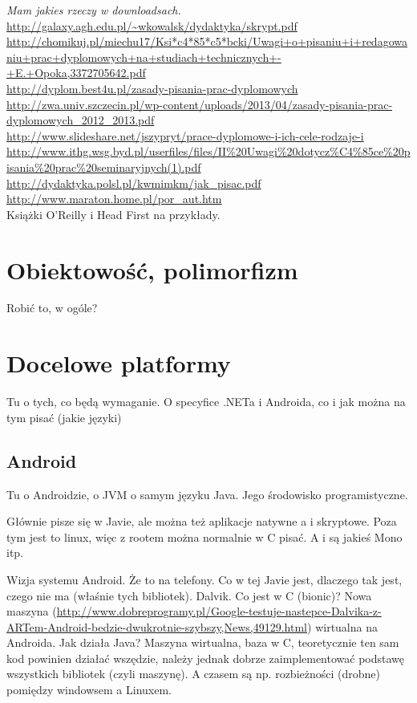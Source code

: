 \emph{Mam jakies rzeczy w downloadsach.} \\
\url{http://galaxy.agh.edu.pl/~wkowalsk/dydaktyka/skrypt.pdf}\\
\url{http://chomikuj.pl/miechu17/Ksi*c4*85*c5*bcki/Uwagi+o+pisaniu+i+redagowaniu+prac+dyplomowych+na+studiach+technicznych+-+E.+Opoka,3372705642.pdf}\\
\url{http://dyplom.best4u.pl/zasady-pisania-prac-dyplomowych}\\
\url{http://zwa.univ.szczecin.pl/wp-content/uploads/2013/04/zasady-pisania-prac-dyplomowych_2012_2013.pdf}\\
\url{http://www.slideshare.net/jszypryt/prace-dyplomowe-i-ich-cele-rodzaje-i}\\
\url{http://www.ithg.wsg.byd.pl/userfiles/files/II%20Uwagi%20dotycz%C4%85ce%20pisania%20prac%20seminaryjnych(1).pdf}\\
\url{http://dydaktyka.polsl.pl/kwmimkm/jak_pisac.pdf}\\
\url{http://www.maraton.home.pl/por_aut.htm}\\

Książki O'Reilly i Head First na przykłady.

\section{Obiektowość, polimorfizm}
Robić to, w ogóle?

\section{Docelowe platformy}
Tu o tych, co będą wymaganie. O specyfice .NETa i Androida, co i jak można na tym pisać (jakie języki)

\subsection{Android}
Tu o Androidzie, o JVM o samym języku Java. Jego środowisko programistyczne.

Głównie pisze się w Javie, ale można też aplikacje natywne a i skryptowe. Poza tym jest to linux, więc z rootem można normalnie w C pisać. A i są jakieś Mono itp.

Wizja systemu Android. Że to na telefony. Co w tej Javie jest, dlaczego tak jest, czego nie ma (właśnie tych bibliotek). Dalvik. Co jest w C (bionic)? Nowa maszyna (\url{http://www.dobreprogramy.pl/Google-testuje-nastepce-Dalvika-z-ARTem-Android-bedzie-dwukrotnie-szybszy,News,49129.html}) wirtualna na Androida.
Jak działa Java? Maszyna wirtualna, baza w C, teoretycznie ten sam kod powinien działać wszędzie, należy jednak dobrze zaimplementować podstawę wszystkich bibliotek (czyli maszynę). A czasem są np. rozbieżności (drobne) pomiędzy windowsem a Linuxem.

